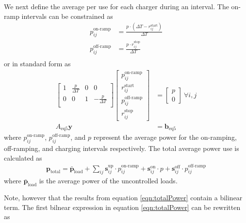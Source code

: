 \par We next define the average per use for each charger during an interval. The on-ramp intervals can be constrained as
\begin{equation}\begin{aligned}
	p^{\text{on-ramp}}_{ij} &= \frac{p\cdot (\Delta T - r^{\text{start}}_{ij})}{\Delta T}\\
	p^{\text{off-ramp}}_{ij} &= \frac{p\cdot r^{\text{stop}}_{ij}}{\Delta T}\\
\end{aligned}\end{equation}
or in standard form as
\begin{equation}\begin{aligned}
	\begin{bmatrix} 1 & \frac{p}{\Delta T} & 0 & 0                   \\
		        0 & 0                  & 1 & -\frac{p}{\Delta T} \\
	\end{bmatrix}
	\begin{bmatrix} p^{\text{on-ramp}}_{ij}  \\
		        r_{ij}^{\text{start}}    \\
			p^{\text{off-ramp}}_{ij} \\ 
			r^{\text{stop}}_{ij} 
	\end{bmatrix} &=
	\begin{bmatrix} p \\
	                0
	\end{bmatrix} \ \forall i,j \\
	A_{\text{eq5}}\mathbf{y} &= \mathbf{b}_{\text{eq5}}
\end{aligned}\end{equation}
where $p_{ij}^{\text{on-ramp}}$, $p_{ij}^{\text{off-ramp}}$, and $p$ represent the average power for the on-ramping, off-ramping, and charging intervals respectively. The total average power use is calculated as 
\begin{align}\label{eqn:totalPower}
	\mathbf{p}_{\text{total}} = \bar{\mathbf{p}}_{\text{load}} + \sum_{ij} \mathbf{s}^{\text{up}}_{ij}\cdot p^{\text{on-ramp}}_{ij} + \mathbf{s}^{\text{on}}_{ij}\cdot p + \mathbf{s}^{\text{off}}_{ij}\cdot p^{\text{off-ramp}}_{ij}
\end{align}
where $\bar{\mathbf{p}}_{\text{load}}$ is the average power of the uncontrolled loads.
\par Note, however that the results from equation \ref{eqn:totalPower} contain a bilinear term. The first bilnear expression in  equation \ref{eqn:totalPower} can be rewritten as 
